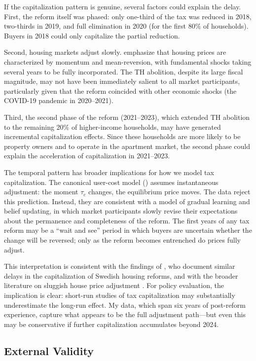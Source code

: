 \documentclass[12pt]{article}
\begin{document}
If the capitalization pattern is genuine, several factors could explain the delay. First, the reform itself was phased: only one-third of the tax was reduced in 2018, two-thirds in 2019, and full elimination in 2020 (for the first 80\% of households). Buyers in 2018 could only capitalize the partial reduction.

Second, housing markets adjust slowly. \citet{glaeser2014housing} emphasize that housing prices are characterized by momentum and mean-reversion, with fundamental shocks taking several years to be fully incorporated. The TH abolition, despite its large fiscal magnitude, may not have been immediately salient to all market participants, particularly given that the reform coincided with other economic shocks (the COVID-19 pandemic in 2020--2021).

Third, the second phase of the reform (2021--2023), which extended TH abolition to the remaining 20\% of higher-income households, may have generated incremental capitalization effects. Since these households are more likely to be property owners and to operate in the apartment market, the second phase could explain the acceleration of capitalization in 2021--2023.

The temporal pattern has broader implications for how we model tax capitalization. The canonical user-cost model () assumes instantaneous adjustment: the moment $\tau_c$ changes, the equilibrium price moves. The data reject this prediction. Instead, they are consistent with a model of gradual learning and belief updating, in which market participants slowly revise their expectations about the permanence and completeness of the reform. The first years of any tax reform may be a ``wait and see'' period in which buyers are uncertain whether the change will be reversed; only as the reform becomes entrenched do prices fully adjust.

This interpretation is consistent with the findings of \citet{elinder2017quantification}, who document similar delays in the capitalization of Swedish housing reforms, and with the broader literature on sluggish house price adjustment \citep{glaeser2014housing}. For policy evaluation, the implication is clear: short-run studies of tax capitalization may substantially underestimate the long-run effect. My data, which span six years of post-reform experience, capture what appears to be the full adjustment path---but even this may be conservative if further capitalization accumulates beyond 2024.

\subsection{External Validity}
\end{document}
